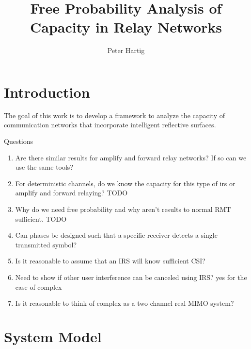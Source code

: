 \documentclass[12pt,a4paper]{report}
\title{Free Probability Analysis of Capacity in Relay Networks}
\author{Peter Hartig}
\begin{document}
\maketitle
\chapter{Introduction}
The goal of this work is to develop a framework to analyze the capacity of communication networks that incorporate intelligent reflective surfaces. 
\par
Questions
\begin{enumerate}
\item Are there similar results for amplify and forward relay networks? If so can we use the same tools?
\item For deterministic channels, do we know the capacity for this type of irs or amplify and forward relaying? TODO
\item Why do we need free probability and why aren't results to normal RMT sufficient. TODO
\item Can phases be designed such that a specific receiver detects a single transmitted symbol?
\item Is it reasonable to assume that an IRS will know sufficient CSI?
\item Need to show if other user interference can be canceled using IRS? yes for the case of complex 
\item Is it reasonable to think of complex as a two channel real MIMO system?
\end{enumerate}
\chapter{System Model}
\end{document}
